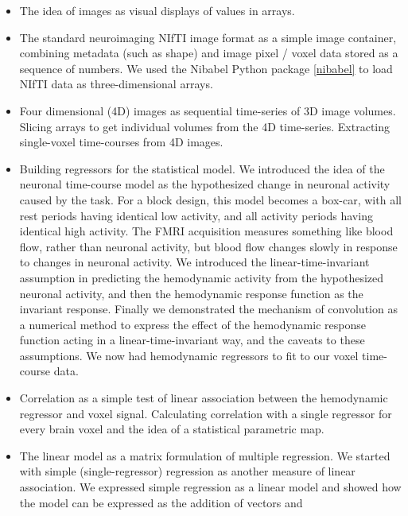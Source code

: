 \begin{itemize}

\item
    The idea of images as visual displays of values in arrays.
\item
    The standard neuroimaging NIfTI image format as a simple image container,
        combining metadata (such as shape) and image pixel / voxel data stored
        as a sequence of numbers.  We used the Nibabel Python package
        \cref{nibabel} to load NIfTI data as three-dimensional arrays.
\item
    Four dimensional (4D) images as sequential time-series of 3D image
        volumes.  Slicing arrays to get individual volumes from the 4D
        time-series.  Extracting single-voxel time-courses from 4D images.
\item
    Building regressors for the statistical model.  We introduced the idea of
        the neuronal time-course model as the hypothesized change in neuronal
        activity caused by the task.  For a block design, this model becomes a
        box-car, with all rest periods having identical low activity, and all
        activity periods having identical high activity.  The FMRI acquisition
        measures something like blood flow, rather than neuronal activity, but
        blood flow changes slowly in response to changes in neuronal activity.
        We introduced the linear-time-invariant assumption in predicting the
        hemodynamic activity from the hypothesized neuronal activity, and then
        the hemodynamic response function as the invariant response.  Finally
        we demonstrated the mechanism of convolution as a numerical method to
        express the effect of the hemodynamic response function acting in a
        linear-time-invariant way, and the caveats to these assumptions.  We
        now had hemodynamic regressors to fit to our voxel time-course data.
\item
    Correlation as a simple test of linear association between the hemodynamic
        regressor and voxel signal.  Calculating correlation with a single
        regressor for every brain voxel and the idea of a statistical
        parametric map.
\item
    The linear model as a matrix formulation of multiple regression.  We started with
        simple (single-regressor) regression as another measure of linear
        association.  We expressed simple regression as a linear model and
        showed how the model can be expressed as the addition of vectors and

\end{itemize}

